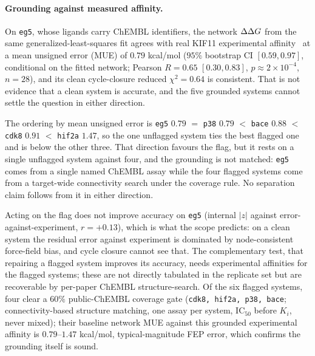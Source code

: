 \paragraph{Grounding against measured affinity.} On \texttt{eg5}, whose ligands carry ChEMBL identifiers, the network $\Delta\Delta G$ from the same
generalized-least-squares fit agrees with real KIF11 experimental
affinity~\citep{zdrazil2024chembl} at a mean unsigned error (MUE) of $0.79$ kcal/mol ($95\%$
bootstrap CI $[0.59,0.97]$, conditional on the fitted network; Pearson $R=0.65$ $[0.30,0.83]$,
$p{\approx}2{\times}10^{-4}$, $n=28$), and its clean cycle-closure reduced $\chi^2=0.64$ is
consistent. That is not evidence that a clean system is accurate, and the five grounded systems
cannot settle the question in either direction.

The ordering by mean unsigned error is \texttt{eg5} $0.79$ $=$ \texttt{p38} $0.79$ $<$
\texttt{bace} $0.88$ $<$ \texttt{cdk8} $0.91$ $<$ \texttt{hif2a} $1.47$, so the one unflagged
system ties the best flagged one and is below the other three. That direction favours the flag, but
it rests on a single unflagged system against four, and the grounding is not matched:
\texttt{eg5} comes from a single named ChEMBL assay while the four flagged systems come from a
target-wide connectivity search under the coverage rule. No separation claim follows from it in
either direction.

Acting on the flag does not improve accuracy on \texttt{eg5} (internal $|z|$ against
error-against-experiment, $r=+0.13$), which is what the scope predicts: on a clean system the
residual error against experiment is dominated by node-consistent force-field bias, and cycle
closure cannot see that. The complementary test, that repairing a flagged system improves its
accuracy, needs experimental affinities for the flagged systems; these are not directly tabulated
in the replicate set but are recoverable by per-paper ChEMBL structure-search. Of the six flagged
systems, four clear a $60\%$ public-ChEMBL coverage gate (\texttt{cdk8, hif2a, p38, bace};
connectivity-based structure matching, one assay per system, $\mathrm{IC}_{50}$ before $K_i$, never
mixed); their baseline network MUE against this grounded experimental affinity is $0.79$--$1.47$
kcal/mol, typical-magnitude FEP error, which confirms the grounding itself is sound.

